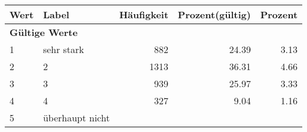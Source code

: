      \begin{longtable}{lXrrr}
     \toprule
     \textbf{Wert} & \textbf{Label} & \textbf{Häufigkeit} & \textbf{Prozent(gültig)} & \textbf{Prozent} \\
     \endhead
     \midrule
     \multicolumn{5}{l}{\textbf{Gültige Werte}}\\

     1 &
     \multicolumn{1}{X}{ sehr stark   } &


       \num{882} &
       \num[round-mode=places,round-precision=2]{24.39} &
         \num[round-mode=places,round-precision=2]{3.13} \\

     2 &
     \multicolumn{1}{X}{ 2   } &


       \num{1313} &
       \num[round-mode=places,round-precision=2]{36.31} &
         \num[round-mode=places,round-precision=2]{4.66} \\

     3 &
     \multicolumn{1}{X}{ 3   } &


       \num{939} &
       \num[round-mode=places,round-precision=2]{25.97} &
         \num[round-mode=places,round-precision=2]{3.33} \\

     4 &
     \multicolumn{1}{X}{ 4   } &


       \num{327} &
       \num[round-mode=places,round-precision=2]{9.04} &
         \num[round-mode=places,round-precision=2]{1.16} \\

     5 &
     \multicolumn{1}{X}{ überhaupt nicht   } &



\end{longtable}
